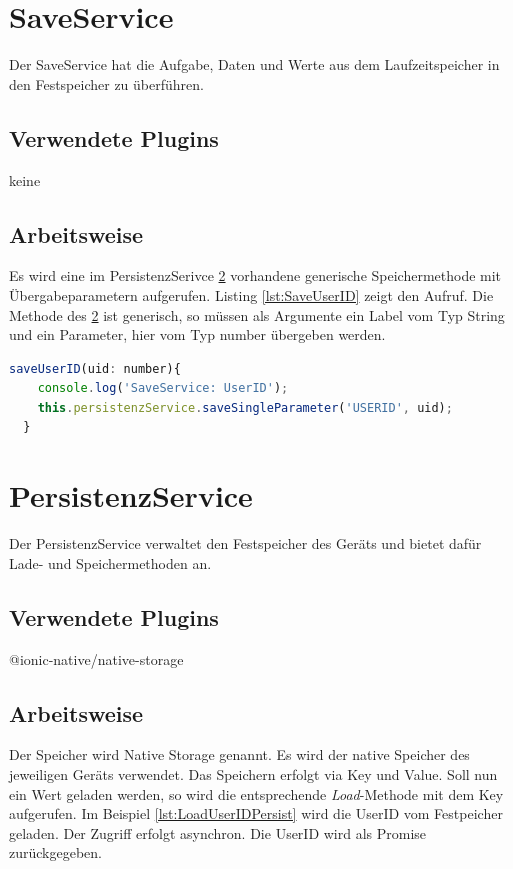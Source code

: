 \section{SaveService}
\label{srv:SaveService}
Der SaveService hat die Aufgabe, Daten und Werte aus dem Laufzeitspeicher  in den Festspeicher  zu überführen.
\subsection{Verwendete Plugins}
keine
\subsection{Arbeitsweise}
Es wird eine im PersistenzSerivce \ref{srv:PersistenzService} vorhandene generische Speichermethode mit Übergabeparametern aufgerufen. Listing \ref{lst:SaveUserID} zeigt den Aufruf. Die Methode des \ref{srv:PersistenzService} ist generisch, so müssen als Argumente ein Label vom Typ String und ein Parameter, hier vom Typ number übergeben werden.

\begin{lstlisting}[float, language=JavaScript, caption= Speichern der UserID , label=lst:SaveUserID]
saveUserID(uid: number){
    console.log('SaveService: UserID');
    this.persistenzService.saveSingleParameter('USERID', uid);
  }
\end{lstlisting}

\section{PersistenzService}
\label{srv:PersistenzService}
Der PersistenzService verwaltet den Festspeicher des Geräts und bietet dafür Lade- und Speichermethoden an.
\subsection{Verwendete Plugins}
@ionic-native/native-storage \cite{NativeStoragePluginDoku}
\subsection{Arbeitsweise}
Der Speicher wird \glqq Native Storage \grqq genannt. Es wird der native Speicher des jeweiligen Geräts verwendet. Das Speichern erfolgt via Key und Value. Soll nun ein Wert geladen werden, so wird die entsprechende \textit{Load}-Methode mit dem Key aufgerufen. Im Beispiel \ref{lst:LoadUserIDPersist} wird die UserID vom Festpeicher geladen. Der Zugriff erfolgt asynchron. Die UserID wird als Promise zurückgegeben.

